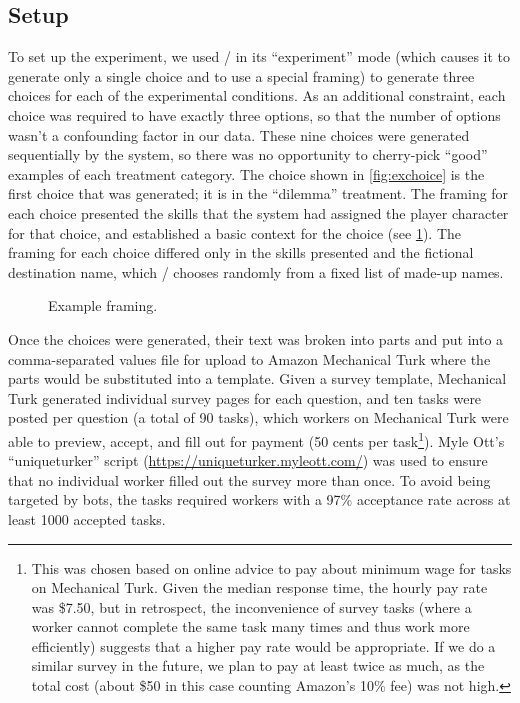 \subsection{Setup}

To set up the experiment, we used \dunyazad/ in its ``experiment'' mode (which causes it to generate only a single choice and to use a special framing) to generate three choices for each of the experimental conditions.
%
As an additional constraint, each choice was required to have exactly three options, so that the number of options wasn't a confounding factor in our data.
%
These nine choices were generated sequentially by the system, so there was no opportunity to cherry-pick ``good'' examples of each treatment category.
%
The choice shown in \cref{fig:exchoice} is the first choice that was generated; it is in the ``dilemma'' treatment.
%
The framing for each choice presented the skills that the system had assigned the player character for that choice, and established a basic context for the choice (see \cref{fig:exframing}).
%
The framing for each choice differed only in the skills presented and the fictional destination name, which \dunyazad/ chooses randomly from a fixed list of made-up names.


\begin{figure}[h]
  \caption{Example framing.}
  \label{fig:exframing}
\end{figure}


Once the choices were generated, their text was broken into parts and put into a comma-separated values file for upload to Amazon Mechanical Turk where the parts would be substituted into a template.
%
Given a survey template, Mechanical Turk generated individual survey pages for each question, and ten tasks were posted per question (a total of 90 tasks), which workers on Mechanical Turk were able to preview, accept, and fill out for payment (50 cents per task\footnote{This was chosen based on online advice to pay about minimum wage for tasks on Mechanical Turk. Given the median response time, the hourly pay rate was \$7.50, but in retrospect, the inconvenience of survey tasks (where a worker cannot complete the same task many times and thus work more efficiently) suggests that a higher pay rate would be appropriate. If we do a similar survey in the future, we plan to pay at least twice as much, as the total cost (about \$50 in this case counting Amazon's 10\% fee) was not high.}).
%
Myle Ott's ``uniqueturker'' script (\url{https://uniqueturker.myleott.com/}) was used to ensure that no individual worker filled out the survey more than once.
%
To avoid being targeted by bots, the tasks required workers with a 97\% acceptance rate across at least 1000 accepted tasks.

